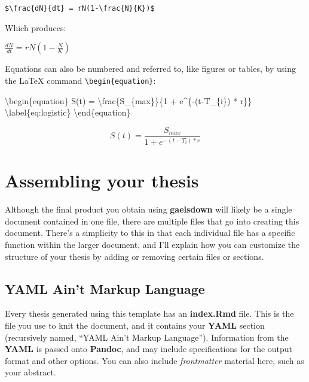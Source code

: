 \documentclass[12pt, oneside]{queensuthesis}
\numberwithin{equation}{chapter}       %
\newenvironment{Shaded}{\begin{snugshade}}{\end{snugshade}}
\newcommand{\DecValTok}[1]{\textcolor[rgb]{0.00,0.00,0.81}{#1}}
\newcommand{\FunctionTok}[1]{\textcolor[rgb]{0.00,0.00,0.00}{#1}}
\newcommand{\NormalTok}[1]{#1}
\newcommand{\OtherTok}[1]{\textcolor[rgb]{0.56,0.35,0.01}{#1}}
\newcommand{\SpecialCharTok}[1]{\textcolor[rgb]{0.00,0.00,0.00}{#1}}
\begin{document}
\texttt{\$\textbackslash{}frac\{dN\}\{dt\}\ =\ rN(1-\textbackslash{}frac\{N\}\{K\})\$}

Which produces:

\(\frac{dN}{dt} = rN(1-\frac{N}{K})\)

Equations can also be numbered and referred to, like figures or tables, by using the LaTeX command \texttt{\textbackslash{}begin\{equation\}}:
\begin{Shaded}
\begin{Highlighting}[]
\NormalTok{\textbackslash{}begin\{equation\}}
\FunctionTok{S}\NormalTok{(t) }\OtherTok{=}\NormalTok{ \textbackslash{}frac\{S\_\{max\}\}\{}\DecValTok{1} \SpecialCharTok{+}\NormalTok{ e}\SpecialCharTok{\^{}}\NormalTok{\{}\SpecialCharTok{{-}}\NormalTok{(t}\SpecialCharTok{{-}}\NormalTok{T\_\{i\}) }\SpecialCharTok{*}\NormalTok{ r\}\} \textbackslash{}label\{eq}\SpecialCharTok{:}\NormalTok{logistic\}}
\NormalTok{\textbackslash{}end\{equation\}}
\end{Highlighting}
\end{Shaded}
\begin{equation}
S(t) = \frac{S_{max}}{1 + e^{-(t-T_{i}) * r}} \label{eq:logistic}
\end{equation}
\hypertarget{assembling-your-thesis}{%
\section{Assembling your thesis}\label{assembling-your-thesis}}

Although the final product you obtain using \textbf{gaelsdown} will likely be a single document contained in one file, there are multiple files that go into creating this document. There's a simplicity to this in that each individual file has a specific function within the larger document, and I'll explain how you can customize the structure of your thesis by adding or removing certain files or sections.

\hypertarget{yaml-aint-markup-language}{%
\subsection{YAML Ain't Markup Language}\label{yaml-aint-markup-language}}

Every thesis generated using this template has an \textbf{index.Rmd} file. This is the file you use to knit the document, and it contains your \textbf{YAML} section (recursively named, ``YAML Ain't Markup Language''). Information from the \textbf{YAML} is passed onto \textbf{Pandoc}, and may include specifications for the output format and other options. You can also include \emph{frontmatter} material here, such as your abstract.
\end{document}
